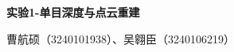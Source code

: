 \documentclass[UTF8,fontset=none,a4paper]{ctexart}
\begin{document}
{\color{ReportTeal}\bfseries\fontsize{14bp}{19bp}\selectfont 实验1-单目深度与点云重建\par}
{\color{ReportInk}曹航硕（3240101938）、吴翱臣（3240106219）\par}






\end{document}
